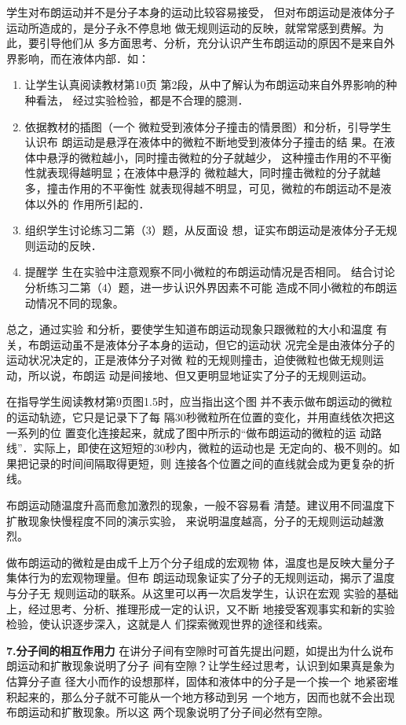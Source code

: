 学生对布朗运动并不是分子本身的运动比较容易接受，
但对布朗运动是液体分子运动所造成的，是分子永不停息地
做无规则运动的反映，就常常感到费解。为此，要引导他们从
多方面思考、分析，充分认识产生布朗运动的原因不是来自外
界影响，而在液体内部．如：
\begin{enumerate}
\item 让学生认真阅读教材第10页
第2段，从中了解认为布朗运动来自外界影响的种种看法，
经过实验检验，都是不合理的臆测．    \item 依据教材的插图（一个
微粒受到液体分子撞击的情景图）和分析，引导学生认识布
朗运动是悬浮在液体中的微粒不断地受到液体分子撞击的结
果。在液体中悬浮的微粒越小，同时撞击微粒的分子就越少，
这种撞击作用的不平衡性就表现得越明显；在液体中悬浮的
微粒越大，同时撞击微粒的分子就越多，撞击作用的不平衡性
就表现得越不明显，可见，微粒的布朗运动不是液体以外的
作用所引起的．    \item 组织学生讨论练习二第（3）题，从反面设
想，证实布朗运动是液体分子无规则运动的反映．    \item 提醒学
生在实验中注意观察不同小微粒的布朗运动情况是否相同。 结合讨论分析练习二第（4）题，进一步认识外界因素不可能
造成不同小微粒的布朗运动情况不同的现象。
\end{enumerate}

总之，通过实验
和分析，要使学生知道布朗运动现象只跟微粒的大小和温度
有关，布朗运动虽不是液体分子本身的运动，但它的运动状
况完全是由液体分子的运动状况决定的，正是液体分子对微
粒的无规则撞击，迫使微粒也做无规则运动，所以说，布朗运
动是间接地、但又更明显地证实了分子的无规则运动。

在指导学生阅读教材第9页图1.5时，应当指出这个图
并不表示做布朗运动的微粒的运动轨迹，它只是记录下了每
隔30秒微粒所在位置的变化，并用直线依次把这一系列的位
置变化连接起来，就成了图中所示的“做布朗运动的微粒的运
动路线”．实际上，即使在这短短的30秒内，微粒的运动也是
无定向的、极不则的。如果把记录的时间间隔取得更短，则
连接各个位置之间的直线就会成为更复杂的折线。

布朗运动随温度升高而愈加激烈的现象，一般不容易看
清楚。建议用不同温度下扩散现象快慢程度不同的演示实验，
来说明温度越高，分子的无规则运动越激烈。

做布朗运动的微粒是由成千上万个分子组成的宏观物
体，温度也是反映大量分子集体行为的宏观物理量。但布
朗运动现象证实了分子的无规则运动，揭示了温度与分子无
规则运动的联系。从这里可以再一次启发学生，认识在宏观
实验的基础上，经过思考、分析、推理形成一定的认识，又不断
地接受客观事实和新的实验检验，使认识逐步深入，这就是人
们探索微观世界的途径和线索。

\textbf{7.分子间的相互作用力}\quad
在讲分子间有空隙时可首先提出问题，如提出为什么说布朗运动和扩散现象说明了分子
间有空隙？让学生经过思考，认识到如果真是象为估算分子直
径大小而作的设想那样，固体和液体中的分子是一个挨一个
地紧密堆积起来的，那么分子就不可能从一个地方移动到另
一个地方，因而也就不会出现布朗运动和扩散现象。所以这
两个现象说明了分子间必然有空隙。

